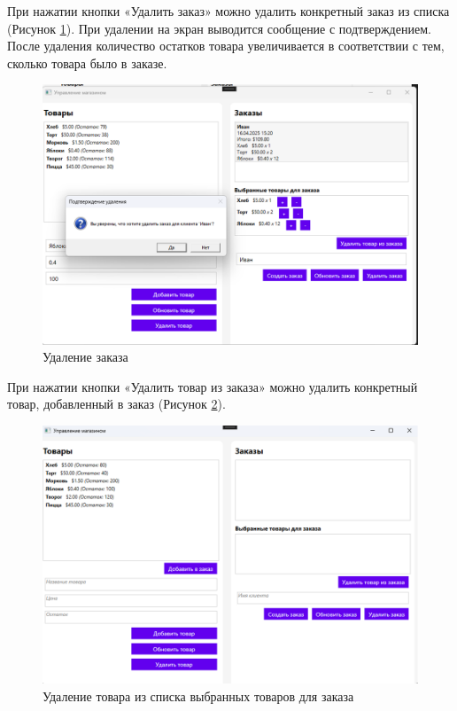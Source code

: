 \documentclass[12pt]{article}
\numberwithin{listing}{section}
\numberwithin{figure}{section}
\begin{document}
\pagebreak

При нажатии кнопки «Удалить заказ» можно удалить конкретный заказ из списка (Рисунок \ref{fig:demo9}). При удалении на экран выводится сообщение с подтверждением. После удаления количество остатков товара увеличивается в соответствии с тем, сколько товара было в заказе.

\begin{figure}[ht]
	\centering
	\includegraphics[width=1.0\textwidth]{fig/image 66.png}
	\caption{Удаление заказа} %
	\label{fig:demo9}
\end{figure}

\pagebreak


При нажатии кнопки «Удалить товар из заказа» можно удалить конкретный товар, добавленный в заказ (Рисунок \ref{fig:demo10}).


\begin{figure}[ht]
	\centering
	\includegraphics[width=1.0\textwidth]{fig/image 67.png}
	\caption{Удаление товара из списка выбранных товаров для заказа} %
	\label{fig:demo10}
\end{figure}
\end{document}
